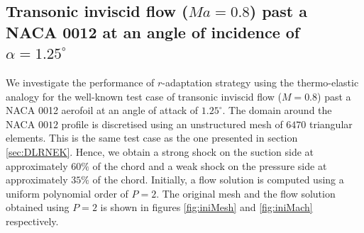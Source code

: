 \documentclass[review]{elsarticle}
\begin{document}
\subsection{Transonic inviscid flow ($Ma=0.8$) past a NACA 0012 at an angle of incidence of $\alpha=1.25^\circ$}
We investigate the performance of $r$-adaptation strategy using the thermo-elastic analogy for the well-known test case of transonic inviscid flow ($M = 0.8$) past a NACA 0012 aerofoil at an angle of attack of $1.25^\circ$. 
The domain around the NACA $0012$ profile is discretised using an unstructured mesh of $6470$ triangular elements. 
This is the same test case as the one presented in section \ref{sec:DLRNEK}. Hence, we obtain a strong shock on the suction side at approximately $60\%$ of the chord and a weak shock on the pressure side at approximately $35\%$ of the chord. 
Initially, a flow solution is computed using a uniform polynomial order of $P=2$.
The original mesh and the flow solution obtained using $P=2$ is shown in figures \ref{fig:iniMesh} and \ref{fig:iniMach} respectively.
\end{document}
